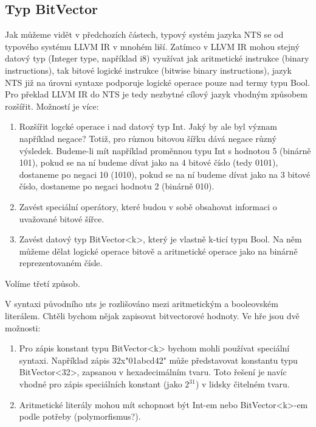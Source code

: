 \documentclass{fithesis2}
\begin{document}
\subsection{Typ BitVector}
Jak můžeme vidět v předchozích částech, typový systém jazyka NTS se od typového systému LLVM IR 
v mnohém liší. Zatímco v LLVM IR mohou stejný datový typ (Integer type, například i8) využívat jak aritmetické instrukce (binary instructions), tak bitové logické instrukce (bitwise binary instructions), jazyk NTS již na úrovni syntaxe podporuje logické operace pouze nad termy typu Bool. Pro překlad LLVM IR do NTS je tedy nezbytné cílový jazyk vhodným způsobem rozšířit. Možností je více:
\begin{enumerate}
\item Rozšířit logcké operace i nad datový typ Int. Jaký by ale byl význam například negace? Totiž, pro různou bitovou šířku dává negace různý výsledek. Budeme-li mít například proměnnou typu Int s hodnotou 5 (binárně 101), pokud se na ní budeme dívat jako na 4 bitové číslo (tedy 0101), dostaneme po negaci 10 (1010), pokud se na ní budeme dívat jako na 3 bitové číslo, dostaneme po negaci hodnotu 2 (binárně 010). 

\item Zavést speciální operátory, které budou v sobě obsahovat informaci o uvažované bitové šířce.

\item Zavést datový typ BitVector<k>, který je vlastně k-ticí typu Bool. Na něm můžeme dělat logické operace bitově a aritmetické operace jako na binárně reprezentovaném čísle. 
\end{enumerate}

Volíme třetí způsob.

V syntaxi původního nts je rozlišováno mezi aritmetickým a booleovském literálem. Chtěli bychom nějak zapisovat bitvectorové hodnoty. Ve hře jsou dvě možnosti:

\begin{enumerate}

\item Pro zápis konstant typu BitVector<k> bychom mohli používat speciální syntaxi. Například zápis 32x"01abcd42" může představovat konstantu typu BitVector<32>, zapsanou v hexadecimálním tvaru. Toto řešení je navíc vhodné pro zápis speciálních konstant (jako $2^{31}$) v lidsky čitelném tvaru. 

\item Aritmetické literály mohou mít schopnost být Int-em nebo BitVector<k>-em podle potřeby (polymorfismus?).

\end{enumerate}
\end{document}
